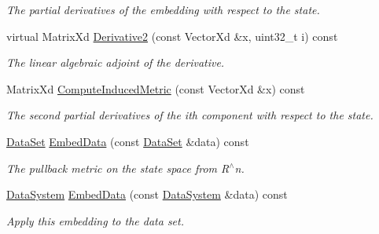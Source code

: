 \begin{DoxyCompactItemize}
\begin{DoxyCompactList}\small\item\em The partial derivatives of the embedding with respect to the state. \end{DoxyCompactList}\item 
\hypertarget{struct_d_r_d_s_p_1_1_embedding_ae651c3ad18c8ad3dbbfea1577d7d395f}{virtual Matrix\-Xd \hyperlink{struct_d_r_d_s_p_1_1_embedding_ae651c3ad18c8ad3dbbfea1577d7d395f}{Derivative2} (const Vector\-Xd \&x, uint32\-\_\-t i) const }\label{struct_d_r_d_s_p_1_1_embedding_ae651c3ad18c8ad3dbbfea1577d7d395f}

\begin{DoxyCompactList}\small\item\em The linear algebraic adjoint of the derivative. \end{DoxyCompactList}\item 
\hypertarget{struct_d_r_d_s_p_1_1_embedding_a5d28c64ee0aa19fb2481f16795b31765}{Matrix\-Xd \hyperlink{struct_d_r_d_s_p_1_1_embedding_a5d28c64ee0aa19fb2481f16795b31765}{Compute\-Induced\-Metric} (const Vector\-Xd \&x) const }\label{struct_d_r_d_s_p_1_1_embedding_a5d28c64ee0aa19fb2481f16795b31765}

\begin{DoxyCompactList}\small\item\em The second partial derivatives of the ith component with respect to the state. \end{DoxyCompactList}\item 
\hypertarget{struct_d_r_d_s_p_1_1_embedding_a71acf702383901f9d4aa6fb198dc0892}{\hyperlink{struct_d_r_d_s_p_1_1_data_set}{Data\-Set} \hyperlink{struct_d_r_d_s_p_1_1_embedding_a71acf702383901f9d4aa6fb198dc0892}{Embed\-Data} (const \hyperlink{struct_d_r_d_s_p_1_1_data_set}{Data\-Set} \&data) const }\label{struct_d_r_d_s_p_1_1_embedding_a71acf702383901f9d4aa6fb198dc0892}

\begin{DoxyCompactList}\small\item\em The pullback metric on the state space from R$^\wedge$n. \end{DoxyCompactList}\item 
\hypertarget{struct_d_r_d_s_p_1_1_embedding_abdf67b0ed050b58fc9a0943d604093ef}{\hyperlink{struct_d_r_d_s_p_1_1_data_system}{Data\-System} \hyperlink{struct_d_r_d_s_p_1_1_embedding_abdf67b0ed050b58fc9a0943d604093ef}{Embed\-Data} (const \hyperlink{struct_d_r_d_s_p_1_1_data_system}{Data\-System} \&data) const }\label{struct_d_r_d_s_p_1_1_embedding_abdf67b0ed050b58fc9a0943d604093ef}

\begin{DoxyCompactList}\small\item\em Apply this embedding to the data set. \end{DoxyCompactList}\end{DoxyCompactItemize}
